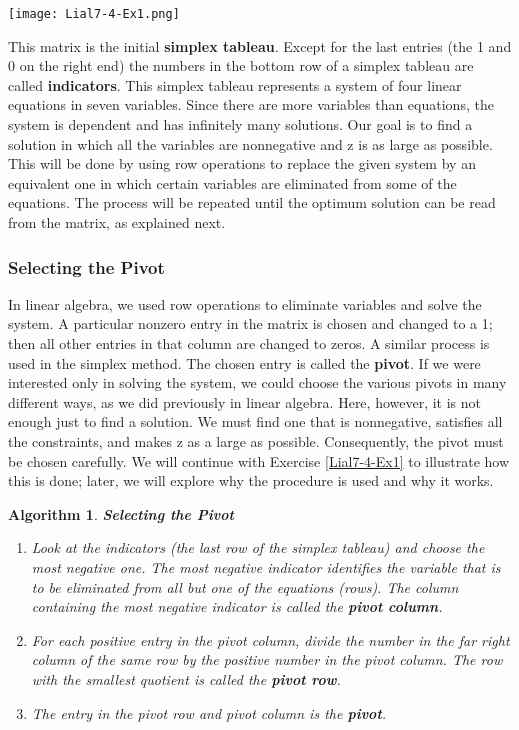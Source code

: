 \documentclass[letterpaper,10pt]{article}
\newtheorem{alg}{Algorithm}%
\begin{document}
\begin{center}
\texttt{[image: Lial7-4-Ex1.png]}
\end{center}

This matrix is the initial {\bf simplex tableau}. Except for the last entries (the 1 and 0 on the right end) the numbers in the bottom row of a simplex tableau are called {\bf indicators}.  This simplex tableau represents a system of four linear equations in seven variables. Since there are more variables than equations, the system is dependent and has infinitely many solutions. Our goal is to find a solution in which all the variables are nonnegative and z is as large as possible. This will be done by using row operations to replace the given system by an equivalent one in which certain variables are eliminated from some of the equations. The process will be repeated until the optimum solution can be read from the matrix, as explained next.

\subsubsection{Selecting the Pivot}

In linear algebra, we used row operations to eliminate variables and solve the system.  A particular nonzero entry in the matrix is chosen and changed to a 1; then all other entries in that column are changed to zeros. A similar process is used in the simplex method. The chosen entry is called the {\bf pivot}. If we were interested only in solving the system, we could choose the various pivots in many different ways, as we did previously in linear algebra. Here, however, it is not
enough just to find a solution. We must find one that is nonnegative, satisfies all the constraints, and makes z as a large as possible. Consequently, the pivot must be chosen carefully.  We will continue with Exercise \ref{Lial7-4-Ex1} to illustrate how this is done; later, we will explore why the procedure is used and why it works.

\begin{alg}\label{pivot}{\bf Selecting the Pivot}
\begin{enumerate}
\item Look at the indicators (the last row of the simplex tableau) and choose the most negative one.  The most negative indicator identifies the variable that is to be eliminated from all but one of the equations (rows).  The column containing the most negative indicator is called the {\bf pivot column}.
\item  For each positive entry in the pivot column, divide the number in the far right column of the same row by the positive number in the pivot column.   The row with the smallest quotient is called the {\bf pivot row}.
\item The entry in the pivot row and pivot column is the {\bf pivot}.


\end{enumerate}
\end{alg}
\end{document}
